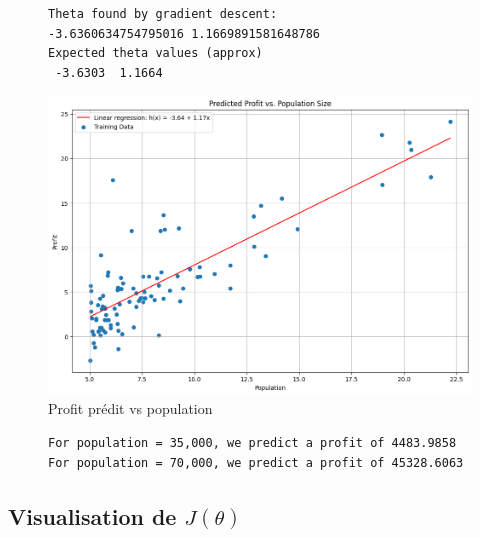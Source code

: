 \begin{figure}[!h]
    \begin{minipage}{.48\linewidth}
\begin{verbatim}
Theta found by gradient descent: 
-3.6360634754795016 1.1669891581648786
Expected theta values (approx)
 -3.6303  1.1664
\end{verbatim}   
 \label{listing:output_gradientDescent}
    \end{minipage}\hfill
    \begin{minipage}{.48\linewidth}
        \begin{center}
            \includegraphics[width=1\textwidth]{./img/4-2-4(2).png}
            \caption{\label{fig:fig2}Profit prédit vs population}  
        \end{center}
    \end{minipage}
\end{figure}

\begin{figure}[!h]
\begin{verbatim}
For population = 35,000, we predict a profit of 4483.9858
For population = 70,000, we predict a profit of 45328.6063
\end{verbatim}   
\label{listing:prediction1}
\end{figure}

\clearpage

\subsection{Visualisation de $J(\theta)$}


